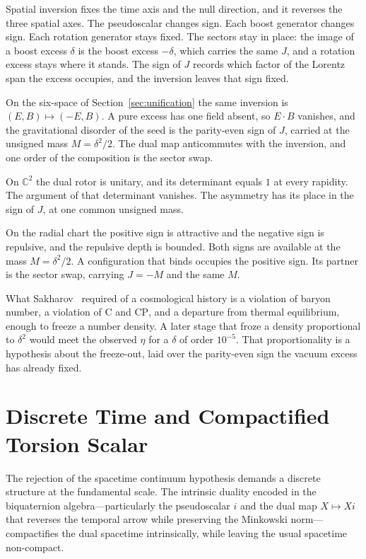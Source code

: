 \documentclass[a4paper]{article}
\begin{document}
Spatial inversion fixes the time axis and the null direction, and it reverses the three spatial axes. The pseudoscalar changes sign. Each boost generator changes sign. Each rotation generator stays fixed. The sectors stay in place: the image of a boost excess $\delta$ is the boost excess $-\delta$, which carries the same $J$, and a rotation excess stays where it stands. The sign of $J$ records which factor of the Lorentz span the excess occupies, and the inversion leaves that sign fixed.

On the six-space of Section~\ref{sec:unification} the same inversion is $(E,B)\mapsto(-E,B)$. A pure excess has one field absent, so $E\cdot B$ vanishes, and the gravitational disorder of the seed is the parity-even sign of $J$, carried at the unsigned mass $M=\delta^2/2$. The dual map anticommutes with the inversion, and one order of the composition is the sector swap.

On $\mathbb{C}^2$ the dual rotor is unitary, and its determinant equals $1$ at every rapidity. The argument of that determinant vanishes. The asymmetry has its place in the sign of $J$, at one common unsigned mass.

On the radial chart the positive sign is attractive and the negative sign is repulsive, and the repulsive depth is bounded. Both signs are available at the mass $M=\delta^2/2$. A configuration that binds occupies the positive sign. Its partner is the sector swap, carrying $J=-M$ and the same $M$.

What Sakharov~\cite{sakharov1967} required of a cosmological history is a violation of baryon number, a violation of $\mathrm{C}$ and $\mathrm{CP}$, and a departure from thermal equilibrium, enough to freeze a number density. A later stage that froze a density proportional to $\delta^2$ would meet the observed $\eta$ for a $\delta$ of order $10^{-5}$. That proportionality is a hypothesis about the freeze-out, laid over the parity-even sign the vacuum excess has already fixed.

\section{Discrete Time and Compactified Torsion Scalar}
\label{sec:discretetime}

The rejection of the spacetime continuum hypothesis demands a discrete structure at the fundamental scale. The intrinsic duality encoded in the biquaternion algebra—particularly the pseudoscalar $i$ and the dual map $X \mapsto Xi$ that reverses the temporal arrow while preserving the Minkowski norm—compactifies the dual spacetime intrinsically, while leaving the usual spacetime non-compact.
\end{document}
